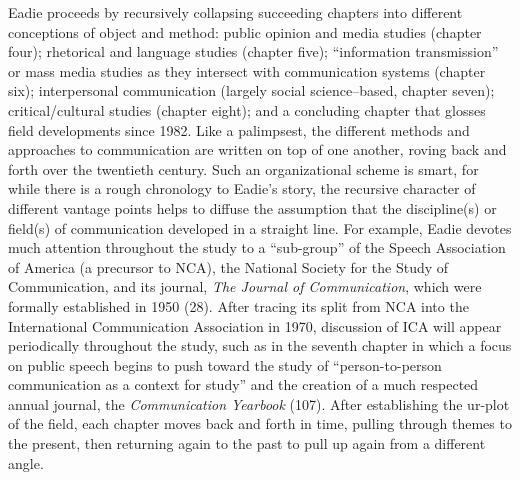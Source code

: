 \documentclass{tufte-handout}
\begin{document}
Eadie proceeds by recursively collapsing succeeding chapters into
different conceptions of object and method: public opinion and media
studies (chapter four); rhetorical and language studies (chapter five);
``information transmission'' or mass media studies as they intersect
with communication systems (chapter six); interpersonal communication
(largely social science--based, chapter seven); critical/cultural
studies (chapter eight); and a concluding chapter that glosses field
developments since 1982. Like a palimpsest, the different methods and
approaches to communication are written on top of one another, roving
back and forth over the twentieth century. Such an organizational scheme
is smart, for while there is a rough chronology to Eadie's story, the
recursive character of different vantage points helps to diffuse the
assumption that the discipline(s) or field(s) of communication developed
in a straight line. For example, Eadie devotes much attention throughout
the study to a ``sub-group'' of the Speech Association of America (a
precursor to NCA), the National Society for the Study of Communication,
and its journal, \emph{The Journal of Communication}, which were
formally established in 1950 (28). After tracing its split from NCA into
the International Communication Association in 1970, discussion of ICA
will appear periodically throughout the study, such as in the seventh
chapter in which a focus on public speech begins to push toward the
study of ``person-to-person communication as a context for study'' and
the creation of a much respected annual journal, the \emph{Communication
Yearbook} (107). After establishing the ur-plot of the field, each
chapter moves back and forth in time, pulling through themes to the
present, then returning again to the past to pull up again from a
different angle.
\end{document}
